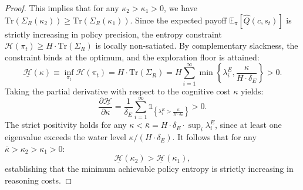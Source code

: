 \begin{proof}
This implies that for any $\kappa_2 > \kappa_1 > 0$, we have $\text{Tr}(\Sigma_R(\kappa_2)) \geq \text{Tr}(\Sigma_R(\kappa_1))$.
Since the expected payoff $\mathbb{E}_\pi[\hat{Q}(c, s_t)]$ is strictly increasing in 
policy precision, the entropy constraint $\mathcal{H}(\pi_t) \geq H \cdot \text{Tr}(\Sigma_R)$ 
is locally non-satiated. By complementary slackness, the constraint binds at the optimum, 
and the exploration floor is attained:
\begin{equation}
\underline{\mathcal{H}}(\kappa) \equiv \inf_{\pi_t} \mathcal{H}(\pi_t) = H \cdot \text{Tr}(\Sigma_R) = H \sum_{i=1}^{\infty} \min\left\{\lambda_i^E, \frac{\kappa}{H \cdot \delta_E}\right\} > 0.
\end{equation}
Taking the partial derivative with respect to the cognitive cost $\kappa$ yields:
\begin{equation}
\frac{\partial \underline{\mathcal{H}}}{\partial \kappa} = \frac{1}{\delta_E} \sum_{i=1}^{\infty} \mathbb{1}_{\left\{\lambda_i^E > \frac{\kappa}{H \cdot \delta_E}\right\}} > 0.
\end{equation}
The strict positivity holds for any $\kappa < \bar{\kappa} = H \cdot \delta_E \cdot \sup_i \lambda_i^E$, 
since at least one eigenvalue exceeds the water level $\kappa/(H \cdot \delta_E)$. 
It follows that for any $\bar{\kappa} > \kappa_2 > \kappa_1 > 0$:
\begin{equation}
\underline{\mathcal{H}}(\kappa_2) > \underline{\mathcal{H}}(\kappa_1),
\end{equation}
establishing that the minimum achievable policy entropy is strictly increasing 
in reasoning costs.
\end{proof}